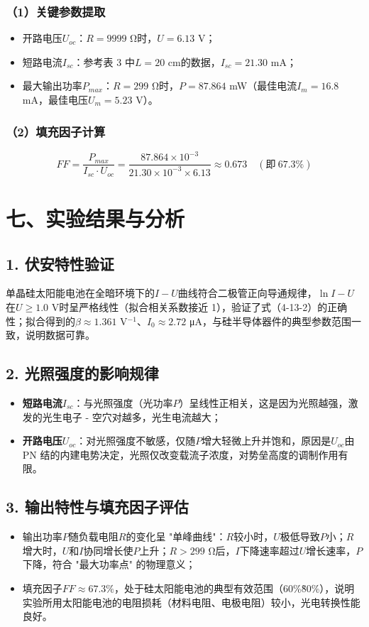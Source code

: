 \documentclass[12pt]{article}
\begin{document}
\subsubsection{（1）关键参数提取}
\begin{itemize}
  \item 开路电压$U_{oc}$：$R=9999$ Ω时，$U=6.13$ V；
  \item 短路电流$I_{sc}$：参考表 3 中$L=20$ cm的数据，$I_{sc}=21.30$ mA；
  \item 最大输出功率$P_{max}$：$R=299$ Ω时，$P=87.864$ mW（最佳电流$I_m=16.8$ mA，最佳电压$U_m=5.23$ V）。
\end{itemize}

\subsubsection{（2）填充因子计算}
$$FF = \frac{P_{max}}{I_{sc} \cdot U_{oc}} = \frac{87.864 \times 10^{-3}}{21.30 \times 10^{-3} \times 6.13} \approx 0.673 \quad (\text{即} \ 67.3\%)$$

\section{七、实验结果与分析}

\subsection{1. 伏安特性验证}
单晶硅太阳能电池在全暗环境下的$I-U$曲线符合二极管正向导通规律，$\ln I-U$在$U \geq 1.0$ V时呈严格线性（拟合相关系数接近 1），验证了式（4-13-2）的正确性；拟合得到的$\beta \approx 1.361$ V$^{-1}$、$I_0 \approx 2.72$ μA，与硅半导体器件的典型参数范围一致，说明数据可靠。

\subsection{2. 光照强度的影响规律}
\begin{itemize}
  \item \textbf{短路电流$I_{sc}$}：与光照强度（光功率$P$）呈线性正相关，这是因为光照越强，激发的光生电子 - 空穴对越多，光生电流越大；
  \item \textbf{开路电压$U_{oc}$}：对光照强度不敏感，仅随$P$增大轻微上升并饱和，原因是$U_{oc}$由 PN 结的内建电势决定，光照仅改变载流子浓度，对势垒高度的调制作用有限。
\end{itemize}

\subsection{3. 输出特性与填充因子评估}
\begin{itemize}
  \item 输出功率$P$随负载电阻$R$的变化呈 "单峰曲线"：$R$较小时，$U$极低导致$P$小；$R$增大时，$U$和$I$协同增长使$P$上升；$R > 299$ Ω后，$I$下降速率超过$U$增长速率，$P$下降，符合 "最大功率点" 的物理意义；
  \item 填充因子$FF \approx 67.3\%$，处于硅太阳能电池的典型有效范围（60\%\~80\%），说明实验所用太阳能电池的电阻损耗（材料电阻、电极电阻）较小，光电转换性能良好。
\end{itemize}
\end{document}
